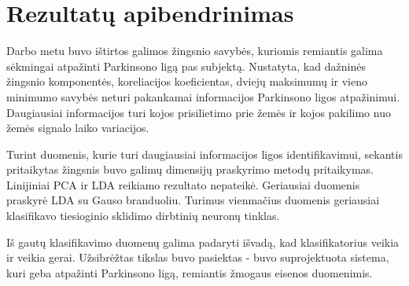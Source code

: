 \documentclass[]{vgtuef}
\begin{document}

\section{Rezultatų apibendrinimas}


Darbo metu buvo ištirtos galimos žingsnio savybės, kuriomis remiantis
galima sėkmingai atpažinti Parkinsono ligą pas subjektą. Nustatyta,
kad dažninės žingsnio komponentės, koreliacijos koeficientas,
dviejų maksimumų ir vieno minimumo savybės neturi pakankamai
informacijos Parkinsono ligos atpažinimui. Daugiausiai informacijos
turi kojos prisilietimo prie žemės ir kojos pakilimo nuo žemės signalo
laiko variacijos.

Turint duomenis, kurie turi daugiausiai informacijos ligos
identifikavimui, sekantis pritaikytas žingsnis buvo galimų dimensijų
praskyrimo metodų pritaikymas. Linijiniai PCA ir LDA reikiamo
rezultato nepateikė. Geriausiai duomenis praskyrė LDA su Gauso
branduoliu. Turimus vienmačius duomenis geriausiai klasifikavo
tiesioginio sklidimo dirbtinių neuronų tinklas. 

Iš gautų klasifikavimo duomenų galima padaryti išvadą, kad
klasifikatorius veikia ir veikia gerai. Užsibrėžtas tikslas buvo
pasiektas - buvo suprojektuota sistema, kuri geba atpažinti Parkinsono
ligą, remiantis žmogaus eisenos duomenimis.







\end{document}
